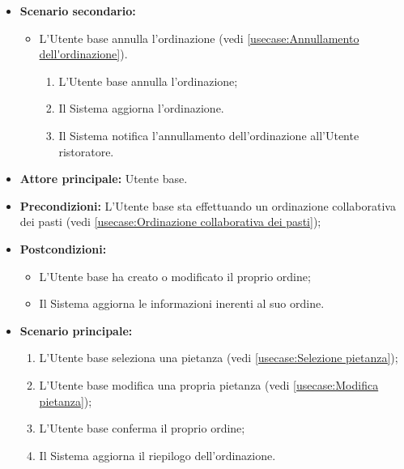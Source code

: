 \begin{itemize}
	\item \textbf{Scenario secondario:}
	      \begin{itemize}
		      \item L'Utente base annulla l'ordinazione (vedi
		            \autoref{usecase:Annullamento dell'ordinazione}).
		            \begin{enumerate}
			            \item L'Utente base annulla l'ordinazione;
			            \item Il Sistema aggiorna l'ordinazione.
			            \item Il Sistema notifica l'annullamento dell'ordinazione
			                  all'Utente ristoratore.
		            \end{enumerate}
	      \end{itemize}
\end{itemize}


\label{usecase:Creazione e modifica del proprio ordine}
\begin{itemize}
	\item \textbf{Attore principale:} Utente base.

	\item \textbf{Precondizioni:} L'Utente base sta effettuando un ordinazione collaborativa dei pasti (vedi \autoref{usecase:Ordinazione collaborativa dei pasti});

	\item \textbf{Postcondizioni:}
		\begin{itemize}
			\item L'Utente base ha creato o modificato il proprio ordine;
			\item Il Sistema aggiorna le informazioni inerenti al suo ordine.
		\end{itemize}

	\item \textbf{Scenario principale:}
	      \begin{enumerate}
		      \item L'Utente base seleziona una pietanza (vedi \autoref{usecase:Selezione pietanza});
		      \item L'Utente base modifica una propria pietanza (vedi \autoref{usecase:Modifica pietanza});
		      \item L'Utente base conferma il proprio ordine;
		      \item Il Sistema aggiorna il riepilogo dell'ordinazione.
	      \end{enumerate}
\end{itemize}


